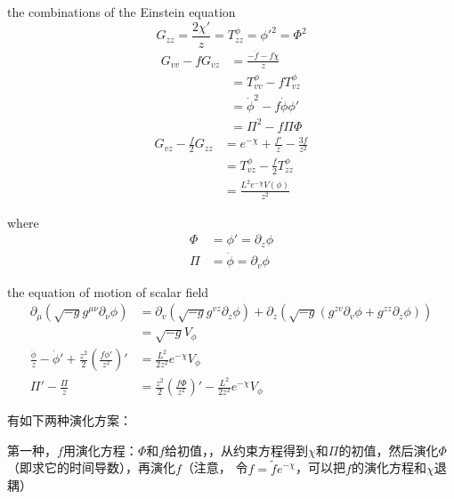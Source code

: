\documentclass[12pt,a4paper]{ctexart}
\numberwithin{equation}{section}
\begin{document}
the combinations of the Einstein equation
\begin{equation}
    G_{zz}=\frac{2\chi'}{z}=T_{zz}^\phi=\phi'^2=\Phi^2
\end{equation}
\begin{equation}
    \begin{aligned}
        G_{vv}-fG_{vz}&=\frac{-\dot{f}-f\dot{\chi}}{z}\\
        &=T_{vv}^\phi-fT_{vz}^\phi\\
        &=\dot{\phi}^2-f\dot{\phi}\phi'\\
        &=\Pi^2-f\Pi\Phi
    \end{aligned}
\end{equation}
\begin{equation}
    \begin{aligned}
        G_{vz}-\frac{f}{2}G_{zz}&=e^{-\chi}+\frac{f'}{z}-\frac{3f}{z^2}\\
        &=T_{vz}^\phi-\frac{f}{2}T_{zz}^\phi\\
        &=\frac{L^2 e^{-\chi } V(\phi )}{z^2}
    \end{aligned}
\end{equation}

where
\begin{equation}
    \begin{aligned}
        \Phi&=\phi'=\partial_z\phi\\
        \Pi&=\dot{\phi}=\partial_v\phi
    \end{aligned}
\end{equation}

the equation of motion of scalar field
\begin{equation}
    \begin{aligned}
        \partial_\mu(\sqrt{-g}g^{\mu\nu}\partial_\nu\phi)&=\partial_v(\sqrt{-g}g^{vz}\partial_z\phi)+\partial_z(\sqrt{-g}(g^{zv}\partial_v\phi+g^{zz}\partial_z\phi))\\
        &=\sqrt{-g}V_\phi\\
        \frac{\dot{\phi}}{z}-\dot{\phi}'+\frac{z^2}{2}\left(\frac{f\phi'}{z^2}\right)'&=\frac{L^2}{2z^2}e^{-\chi}V_\phi\\
        \Pi'-\frac{\Pi}{z}&=\frac{z^2}{2}\left(\frac{f\Phi}{z^2}\right)'-\frac{L^2}{2z^2}e^{-\chi}V_\phi
    \end{aligned}
\end{equation}

有如下两种演化方案：

第一种，$f$用演化方程：$\Phi$和$f$给初值，，从约束方程得到$\chi$和$\Pi$的初值，然后演化$\Phi$（即求它的时间导数），再演化$f$（注意，
令$f=\tilde{f}e^{-\chi}$，可以把$f$的演化方程和$\chi$退耦）
\end{document}
